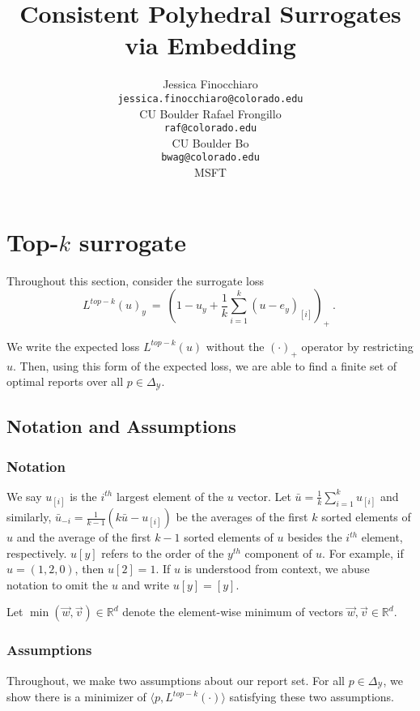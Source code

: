 \documentclass[12pt]{article}
\title{Consistent Polyhedral Surrogates via Embedding}
\author{%
 Jessica Finocchiaro\raf{Jessie?} \\
 \texttt{jessica.finocchiaro@colorado.edu}\\
 CU Boulder
 \And
 Rafael Frongillo\\
 \texttt{raf@colorado.edu}\\
 CU Boulder
 \And
 Bo\\
 \texttt{bwag@colorado.edu}\\
 MSFT
}
\newcommand{\reals}{\mathbb{R}}
\newcommand{\simplex}{\Delta_\Y}
\newcommand{\Y}{\mathcal{Y}}
\newcommand{\inprod}[2]{\langle #1, #2 \rangle}%
\newtheorem{assumption}{Assumption}
\begin{document}
\section{Top-$k$ surrogate}

Throughout this section, consider the surrogate loss \begin{equation}\label{eq:top-k-surrogate}
L^{top-k}(u)_y~=~\left(1 - u_y + \frac{1}{k} \sum_{i=1}^k (u - e_y)_{[i]} \right)_+~.~
\end{equation}

We write the expected loss $L^{top-k}(u)$ without the $(\cdot)_+$ operator by restricting $u$.
Then, using this form of the expected loss, we are able to find a finite set of optimal reports over all $p \in \simplex$.

\subsection{Notation and Assumptions}
\subsubsection{Notation}
We say $u_{[i]}$ is the $i^{th}$ largest element of the $u$ vector.
Let $\bar{u} = \frac 1 k \sum_{i = 1}^k u_{[i]}$ and similarly, $\bar{u}_{-i} = \frac{1}{k-1} (k \bar u - u_{[i]})$ be the averages of the first $k$ sorted elements of $u$ and the average of the first $k-1$ sorted elements of $u$ besides the $i^{th}$ element, respectively.
$u[y]$ refers to the order of the $y^{th}$ component of $u$.
For example, if $u = (1,2,0)$, then $u[2] = 1$. 
If $u$ is understood from context, we abuse notation to omit the $u$ and write $u[y] = [y]$.

Let $\min(\vec w, \vec v) \in \reals^d$ denote the element-wise minimum of vectors $\vec w, \vec v \in \reals^d$.

\subsubsection{Assumptions}\label{sec:assumptions}
Throughout, we make two assumptions about our report set. 
For all $p \in \simplex$, we show there is a minimizer of $\inprod{p}{L^{top-k}(\cdot)}$ satisfying these two assumptions.

\end{document}
